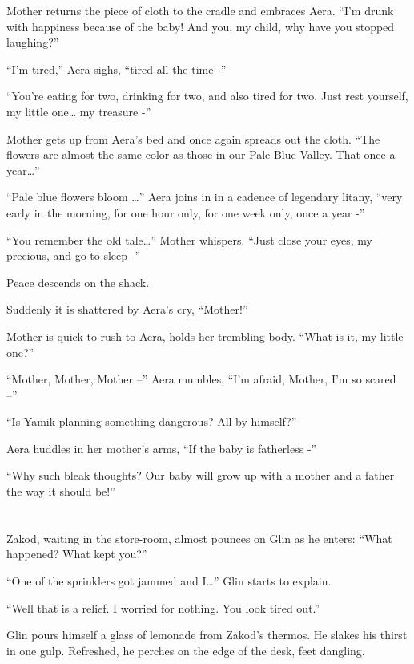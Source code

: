 \documentclass[twoside,11pt]{book}
\begin{document}
Mother returns the piece of cloth to the cradle and embraces Aera.  ``I'm drunk with happiness because of
the baby! And you, my child, why have you stopped laughing?''

``I'm tired,'' Aera sighs, ``tired all the time -''

``You're eating for two, drinking for two, and also tired for two. Just rest yourself, my little one{\ldots} my
treasure -''

Mother gets up from Aera's bed and once again spreads out the cloth. ``The flowers are almost the same
color as those in our Pale Blue Valley. That once a year{\dots}''

``Pale blue flowers bloom {\dots}'' Aera joins in in a cadence of legendary litany,
``very early in the morning, for one hour only, for one week only, once a year -''

``You remember the old tale{\ldots}'' Mother whispers. ``Just close your eyes, my
precious, and go to sleep -''

Peace descends on the shack.

Suddenly it is shattered by Aera's cry, ``Mother!''

Mother is quick to rush to Aera, holds her trembling body. ``What is it, my little one?''

``Mother, Mother, Mother --'' Aera mumbles, ``I'm afraid, Mother, I'm so scared
--''

``Is Yamik planning something dangerous? All by himself?''

Aera huddles in her mother's arms, ``If the baby is fatherless -''

``Why such bleak thoughts? Our baby will grow up with a mother and a father the way it should
be!''


\bigskip

\chapter{}

Zakod, waiting in the store-room, almost pounces on Glin as he enters: ``What happened? What kept
you?''

``One of the sprinklers got jammed and I{\dots}'' Glin starts to explain.

``Well that is a relief. I worried for nothing. You look tired out.''

Glin pours himself a glass of lemonade from Zakod's thermos. He slakes his
thirst in one gulp. Refreshed, he perches on the edge of the desk, feet dangling.
\end{document}
